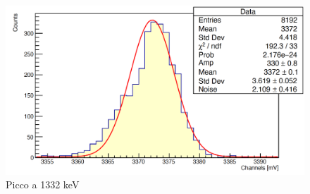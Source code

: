 \documentclass[a4paper,10pt]{article}
\begin{document}
\begin{figure}[H]
    \centering
    \includegraphics[scale=0.45]{appendice/spettri/CoA2_20}
    \caption{Picco a 1332 keV}
\end{figure}


\end{document}
